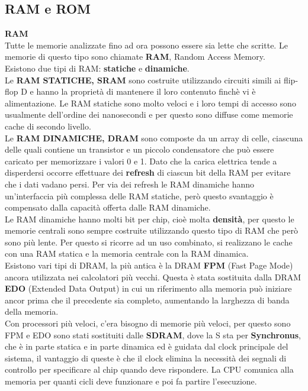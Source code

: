 \documentclass[12pt]{report}
\begin{document}
			\subsection{RAM e ROM}
			\textbf{RAM} \\
			Tutte le memorie analizzate fino ad ora possono essere sia lette che scritte. Le memorie di questo tipo sono chiamate \textbf{RAM}, Random Access Memory. \\
			Esistono due tipi di RAM: \textbf{statiche} e \textbf{dinamiche}. \\
			Le \textbf{RAM STATICHE, SRAM} sono costruite utilizzando circuiti simili ai flip-flop D e hanno la proprietà di mantenere il loro contenuto finchè vi è alimentazione. Le RAM statiche sono molto veloci e i loro tempi di accesso sono usualmente dell'ordine dei nanosecondi e per questo sono diffuse come memorie cache di secondo livello. \\
			Le \textbf{RAM DINAMICHE, DRAM} sono composte da un array di celle, ciascuna delle quali contiene un transistor e un piccolo condensatore che può essere caricato per memorizzare i valori 0 e 1. Dato che la carica elettrica tende a disperdersi occorre effettuare dei \textbf{refresh} di ciascun bit della RAM per evitare che i dati vadano persi.  Per via dei refresh le RAM dinamiche hanno un'interfaccia più complessa delle RAM statiche, però questo svantaggio è compensato dalla capacità offerta dalle RAM dinamiche. \\
			Le RAM dinamiche hanno molti bit per chip, cioè molta \textbf{densità}, per questo le memorie centrali sono sempre costruite utilizzando questo tipo di RAM che però sono più lente. Per questo si ricorre ad un uso combinato, si realizzano le cache con una RAM statica e la memoria centrale con la RAM dinamica. \\
			Esistono vari tipi di DRAM, la più antica è la DRAM \textbf{FPM} (Fast Page Mode) ancora utilizzata nei calcolatori più vecchi. Questa è stata sostituita dalla DRAM \textbf{EDO} (Extended Data Output) in cui un riferimento alla memoria può iniziare ancor prima che il precedente sia completo, aumentando la larghezza di banda della memoria. \\
			Con processori più veloci, c'era bisogno di memorie più veloci, per questo sono FPM e EDO sono stati sostituiti dalle \textbf{SDRAM}, dove la S sta per \textbf{Synchronus}, che è in parte statica e in parte dinamica ed è guidata dal clock principale del sistema, il vantaggio di queste è che il clock elimina la necessità dei segnali di controllo per specificare al chip quando deve rispondere. La CPU comunica alla memoria per quanti cicli deve funzionare e poi fa partire l'esecuzione. \\
\end{document}
